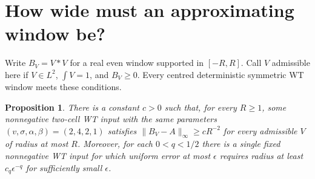 \documentclass[11pt]{article}
\newtheorem{proposition}[theorem]{Proposition}
\newcommand{\norm}[1]{\lVert #1\rVert}
\begin{document}
\section{How wide must an approximating window be?}
Write \(B_V=V*V\) for a real even window supported in \([-R,R]\). Call \(V\) admissible here if \(V\in L^2\), \(\int V=1\), and \(B_V\ge0\). Every centred deterministic symmetric WT window meets these conditions.

\begin{proposition}\label{prop:width}
There is a constant \(c>0\) such that, for every \(R\ge1\), some nonnegative two-cell WT input with the same parameters \((v,\sigma,\alpha,\beta)=(2,4,2,1)\) satisfies
\(\norm{B_V-A}_\infty\ge cR^{-2}\) for every admissible \(V\) of radius at most \(R\).
Moreover, for each \(0<q<1/2\) there is a single fixed nonnegative WT input for which uniform error at most \(\epsilon\) requires radius at least \(c_q\epsilon^{-q}\) for sufficiently small \(\epsilon\).
\end{proposition}
\end{document}
